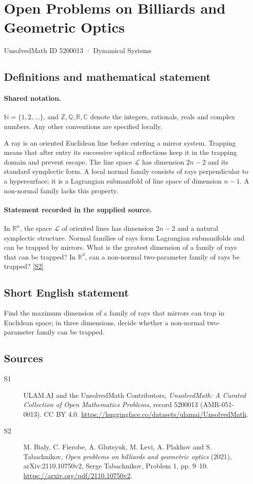 \documentclass[11pt]{article}
\newcommand{\sref}[2]{\hyperlink{source:#1:#2}{[S#2]}}
\begin{document}
\setcounter{section}{5200012}
\section{Open Problems on Billiards and Geometric Optics}\label{5200013}
{\small\sffamily UnsolvedMath ID 5200013 · Dynamical Systems}
\subsection{Definitions and mathematical statement}

\paragraph{Shared notation.}$\mathbb N=\{1,2,\ldots\}$, and $\mathbb Z,\mathbb Q,\mathbb R,\mathbb C$ denote the integers, rationals, reals and complex numbers. Any other conventions are specified locally.


A ray is an oriented Euclidean line before entering a mirror system. Trapping means that after entry its successive optical reflections keep it in the trapping domain and prevent escape. The line space $\mathcal L$ has dimension $2n-2$ and its standard symplectic form. A local normal family consists of rays perpendicular to a hypersurface; it is a Lagrangian submanifold of line space of dimension $n-1$. A non-normal family lacks this property.
\paragraph{Statement recorded in the supplied source.}
In $\mathbb{R}^n$, the space $\mathcal{L}$ of oriented lines has dimension $2n-2$ and a natural symplectic structure. Normal families of rays form Lagrangian submanifolds and can be trapped by mirrors. What is the greatest dimension of a family of rays that can be trapped? In $\mathbb{R}^3$, can a non-normal two-parameter family of rays be trapped? \sref{5200013}{2}
\subsection{Short English statement}
Find the maximum dimension of a family of rays that mirrors can trap in Euclidean space; in three dimensions, decide whether a non-normal two-parameter family can be trapped.
\subsection{Sources}
\begin{description}
\item[\hypertarget{source:5200013:1}{S1}] ULAM.AI and the UnsolvedMath Contributors, \emph{UnsolvedMath: A Curated Collection of Open Mathematics Problems}, record 5200013 (AMR-051-0013). CC BY 4.0. \url{https://huggingface.co/datasets/ulamai/UnsolvedMath}.
\item[\hypertarget{source:5200013:2}{S2}] M. Bialy, C. Fierobe, A. Glutsyuk, M. Levi, A. Plakhov and S. Tabachnikov, \emph{Open problems on billiards and geometric optics} (2021), arXiv:2110.10750v2, Serge Tabachnikov, Problem 1, pp. 9--10. \url{https://arxiv.org/pdf/2110.10750v2}.
\end{description}
\label{end:5200013}
\end{document}
